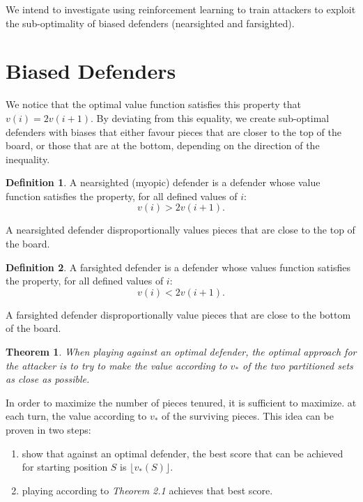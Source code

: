 \documentclass{article}
\theoremstyle{plain}
\newtheorem{thm}{Theorem}[section]
\theoremstyle{definition}
\newtheorem{defn}{Definition}[section]
\theoremstyle{remark}
\newcommand{\floor}[1]{\lfloor #1 \rfloor}
\begin{document}
We intend to investigate using reinforcement learning to train attackers to exploit the sub-optimality of biased defenders (nearsighted and farsighted).


\section{Biased Defenders} %

We notice that the optimal value function satisfies this property that $v(i) = 2v(i+1)$. By deviating from this equality, we create sub-optimal defenders with biases that either favour pieces that are closer to the top of the board, or those that are at the bottom, depending on the direction of the inequality.

\begin{defn}
A nearsighted (myopic) defender is a defender whose value function satisfies the property, for all defined values of $i$:
\begin{equation}
	v(i) > 2v(i + 1).
\end{equation}
\end{defn}

A nearsighted defender disproportionally values pieces that are close to the top of the board. 

\begin{defn}
A farsighted defender is a defender whose values function satisfies the property, for all defined values of $i$:
\begin{equation}
	v(i) < 2v(i + 1).
\end{equation}
\end{defn}

A farsighted defender disproportionally value pieces that are close to the bottom of the board. \\

\begin{thm}
When playing against an optimal defender, the optimal approach for the attacker is to try to make the value according to $v_{*}$ of the two partitioned sets as close as possible. 
\end{thm}

In order to maximize the number of pieces tenured, it is sufficient to maximize. at each turn, the value according to $v_{*}$ of the surviving pieces. This idea can be proven in two steps: 
\begin{enumerate}
  \item show that against an optimal defender, the best score that can be achieved for starting position $S$ is $\floor{v_{*}(S)}$.
  \item playing according to \textit{Theorem 2.1} achieves that best score. 
\end{enumerate}
\end{document}
